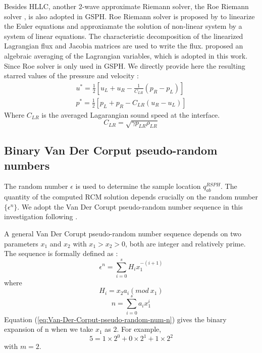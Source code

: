 Besides HLLC, another 2-wave approximate Riemann solver, the Roe Riemann solver \citep{roe1981approximate}, is also adopted in GSPH.
Roe Riemann solver is proposed by \citet{roe1981approximate} to linearize the Euler equations and approxiamate the solution of non-linear system by a system of linear equations. The characteristic decomposition of the linearized Lagrangian flux and Jacobia matrices are used to write the flux. \citet{rider1994review} proposed an algebraic averaging of the Lagrangian variables, which is adopted in this work. Since Roe solver is only used in GSPH. We directly provide here the resulting starred values of the pressure and velocity \citep{puri2014approximate}: 
\begin{eqnarray}
u^{\ast} = \frac{1}{2} \left[ u_L + u_R - \frac{1}{C_{LR}} (p_R - p_L) \right] \label{eq:RP-solver-ROE-u} \\
p^{\ast} = \frac{1}{2}\left[ p_L + p_R - C_{LR} (u_R - u_L) \right] \label{eq:RP-solver-ROE-p}
\end{eqnarray}
Where $C_{LR}$ is the averaged Lagarangian sound speed at the interface.
\begin{equation}
C_{LR} = \sqrt{\gamma p_{LR} \rho_{LR}}
\end{equation}

\subsection{Binary Van Der Corput pseudo-random numbers} \label{sec:Van-Der-Corput-random-num}
The random number $\epsilon$ is used to determine the sample location $q_{ab}^{RSPH}$. The quantity of the computed RCM solution depends crucially on the random number $\{\epsilon ^n\}$. We adopt the Van Der Corupt pseudo-random number sequence \citep{hammersley2013monte} in this investigation following \citet{colella1982glimm}.

A general Van Der Corupt pseudo-random number sequence depends on two parameters $x_1$ and $x_2$ with $x_1 > x_2 > 0$, both are integer and relatively prime. The sequence is formally defined as \citep{hammersley2013monte}:
\begin{equation}
\epsilon ^n = \sum_{i=0}^{s} H_i x_1^{-(i+1)}
\label{eq:Van-Der-Corput-pseudo-random-num}
\end{equation}
where
\begin{equation}
H_i = x_2 a_i(mod \ x_1)
\label{eq:Van-Der-Corput-pseudo-random-num-Hi}
\end{equation} 
\begin{equation}
n = \sum_{i=0}^{s} a_i x_1^i
\label{eq:Van-Der-Corput-pseudo-random-num-n}
\end{equation} 
Equation (\ref{eq:Van-Der-Corput-pseudo-random-num-n}) gives the binary expansion of n when we take $x_1$ as $2$. For example,
\begin{equation}
5=1 \times 2^0 + 0 \times 2^1 + 1 \times 2^2
\end{equation}
with $m=2$. 

